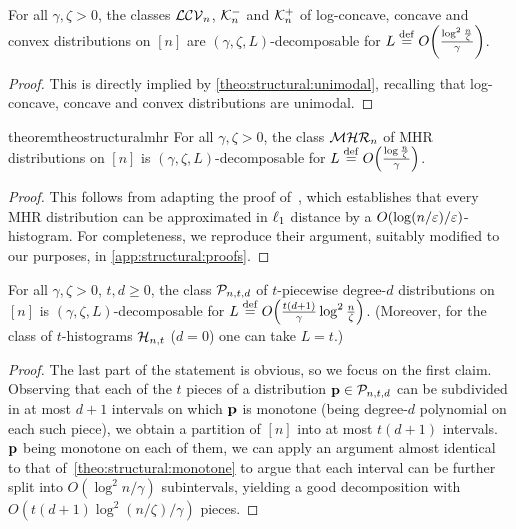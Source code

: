 \begin{corollary}\label{theo:structural:logconcave}
For all $\gamma,\zeta > 0$, the classes $\classlogconcave$, $\classcve$ and $\classcvx$ of log-concave, concave and convex distributions on $[n]$ are $(\gamma,\zeta,L)$-decomposable for $L \eqdef \bigO{\frac{\log^2 \frac{n}{\zeta}}{\gamma}}$.
\end{corollary}
\begin{proof}
This is directly implied by \cref{theo:structural:unimodal}, recalling that log-concave, concave and convex distributions are unimodal.
\end{proof}

\begin{restatable}{theorem}{theostructuralmhr}\label{theo:structural:mhr}
For all $\gamma,\zeta > 0$, the class $\classmhr$ of MHR distributions on $[n]$ is $(\gamma,\zeta,L)$-decomposable for $L \eqdef \bigO{\frac{\log \frac{n}{\zeta}}{\gamma}}$.
\end{restatable}
\begin{proof}
This follows from adapting the proof of~\cite{CDSS:13}, which establishes that every MHR distribution can be approximated in $\lp[1]$ distance by a $\bigO{\log(n/\eps)/\eps}$-histogram. For completeness, we reproduce their argument, suitably modified to our purposes, in \cref{app:structural:proofs}.
\end{proof}

\begin{theorem}\label{theo:structural:piecewise}
For all $\gamma,\zeta > 0$, $t,d\geq 0$, the class $\classpoly[t,d]$ of $t$-piecewise degree-$d$ distributions on $[n]$ is $(\gamma,\zeta,L)$-decomposable for $L \eqdef \bigO{\frac{t(d+1)}{\gamma}\log^2 \frac{n}{\zeta}}$. (Moreover, for the class of $t$-histograms $\classhist$ ($d=0$) one can take $L = t$.)
\end{theorem}
\begin{proof}
The last part of the statement is obvious, so we focus on the first claim. Observing that each of the $t$ pieces of a distribution $\D\in\classpoly[t,d]$ can be subdivided in at most $d+1$ intervals on which $\D$ is monotone (being degree-$d$ polynomial on each such piece), we obtain a partition of $[n]$ into at most $t(d+1)$ intervals. $\D$ being monotone on each of them, we can apply an argument almost identical to that of~\cref{theo:structural:monotone} to argue that each interval can be further split into $O(\log^2 n/\gamma)$ subintervals, yielding a good decomposition with $O( t(d+1)\log^2 ({n}/{\zeta})/\gamma )$ pieces.
\end{proof}



